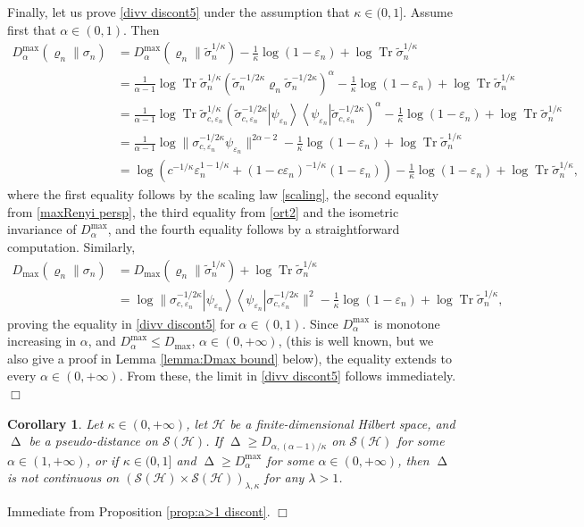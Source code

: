 \documentclass[unsortedaddress,superscriptaddress,pra,notitlepage]{revtex4}
\newtheorem{cor}[definition]{Corollary}
\newenvironment{proof}[1][Proof]{\begin{trivlist}
\item[\hskip \labelsep {\bfseries #1}]}{\hfill$\Box$\end{trivlist}}
\def\S{{\mathcal S}}
\def\ep{\varepsilon}
\def\rho{\varrho}
\def\hil{{\mathcal H}}
\def\bz{\left(}
\def\jz{\right)}
\def\pwr{\kappa}
\newcommand{\snorm}[1]{\| #1\|}
\newcommand{\diad}[2]{\left|#1\right\rangle\!\left\langle #2\right|}
\newcommand{\pr}[1]{\diad{#1}{#1}}
\DeclareMathOperator{\Tr}{Tr}
\DeclareMathOperator{\divv}{\Delta}
\begin{document}
\begin{proof}
Finally, let us prove \eqref{divv discont5} under the assumption that 
$\pwr\in(0,1]$. Assume first that $\alpha\in(0,1)$. Then
\begin{align*}
D_{\alpha}^{\max}(\rho_n\|\sigma_n)
&=
D_{\alpha}^{\max}(\rho_n\|\tilde\sigma_n^{1/\pwr})-\frac{1}{\pwr}\log(1-\ep_n)+\log\Tr\tilde\sigma_n^{1/\pwr}\\
&=
\frac{1}{\alpha-1}\log\Tr\tilde\sigma_n^{1/\pwr}\bz\tilde\sigma_n^{-1/2\pwr}\rho_n\tilde\sigma_n^{-1/2\pwr}\jz^{\alpha}-\frac{1}{\pwr}\log(1-\ep_n)
+\log\Tr\tilde\sigma_n^{1/\pwr}\\
&=
\frac{1}{\alpha-1}\log\Tr\tilde\sigma_{c,\ep_n}^{1/\pwr}
\bz\tilde\sigma_{c,\ep_n}^{-1/2\pwr}\pr{\psi_{\ep_n}}\tilde\sigma_{c,\ep_n}^{-1/2\pwr}\jz^{\alpha}-\frac{1}{\pwr}\log(1-\ep_n)
+\log\Tr\tilde\sigma_n^{1/\pwr}\\
&=
\frac{1}{\alpha-1}\log\snorm{\sigma_{c,\ep_n}^{-1/2\pwr}\psi_{\ep_n}}^{2\alpha-2}
-\frac{1}{\pwr}\log(1-\ep_n)
+\log\Tr\tilde\sigma_n^{1/\pwr}\\
&=
\log\bz c^{-1/\pwr}\ep_n^{1-1/\pwr}+(1-c\ep_n)^{-1/\pwr}(1-\ep_n)\jz
-\frac{1}{\pwr}\log(1-\ep_n)
+\log\Tr\tilde\sigma_n^{1/\pwr},
\end{align*}
where the first equality follows by the scaling law \eqref{scaling},
the second equality from \eqref{maxRenyi persp},
the third equality from \eqref{ort2} and the isometric invariance of $D_{\alpha}^{\max}$,
and the fourth equality follows by a straightforward computation.
Similarly,
\begin{align*}
D_{\max}(\rho_n\|\sigma_n)
&=
D_{\max}(\rho_n\|\tilde\sigma_n^{1/\pwr})+\log\Tr\tilde\sigma_n^{1/\pwr}\\
&=
\log\snorm{\sigma_{c,\ep_n}^{-1/2\pwr}\pr{\psi_{\ep_n}}\sigma_{c,\ep_n}^{-1/2\pwr}}^2
-\frac{1}{\pwr}\log(1-\ep_n)
+\log\Tr\tilde\sigma_n^{1/\pwr},
\end{align*}
proving the equality in \eqref{divv discont5} for $\alpha\in(0,1)$. 
Since $D_{\alpha}^{\max}$ is monotone increasing in $\alpha$, and 
$D_{\alpha}^{\max}\le D_{\max}$, $\alpha\in(0,+\infty)$,
(this is well known, but we also give a proof in 
Lemma \ref{lemma:Dmax bound} below), the equality extends to every 
$\alpha\in(0,+\infty)$. From these, the limit in \eqref{divv discont5} follows immediately. 
\end{proof}

\begin{cor}\label{cor:discont by domination}
Let $\pwr\in(0,+\infty)$, let $\hil$ be a finite-dimensional Hilbert space, and 
$\divv$ be a pseudo-distance on $\S(\hil)$.
If $\divv\ge D_{\alpha,(\alpha-1)/\pwr}$ on $\S(\hil)$ for some $\alpha\in(1,+\infty)$, 
or if $\pwr\in(0,1]$ and 
$\divv\ge D_{\alpha}^{\max}$ for some $\alpha\in(0,+\infty)$, then 
$\divv$ is not continuous on $(\S(\hil)\times\S(\hil))_{\lambda,\pwr}$ for any 
$\lambda>1$. 
\end{cor}
\begin{proof}
Immediate from Proposition \ref{prop:a>1 discont}.
\end{proof}
\end{document}
